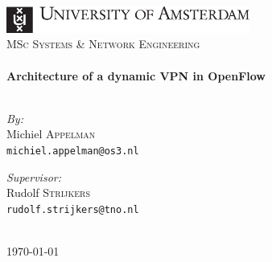 %		
%		
%		

\clearpage
\begin{titlepage}
	\begin{center}
		\hfill \\[2cm]
		\includegraphics[width=8cm]{./includes/uva.pdf}\\[0.4cm]
		{\Large \textsc{MSc Systems \&{} Network Engineering}}\\[4.5cm]
		
		\HRule \\[0.6cm]
		{ \huge \bfseries Architecture of a dynamic VPN in OpenFlow}\\[0.4cm]
		\HRule \\[4.2cm]
		\begin{minipage}
			{0.4
			\textwidth} 
			\begin{flushleft}
				\large \emph{By:}\\
				Michiel \textsc{Appelman} \\
				{\footnotesize \texttt{michiel.appelman@os3.nl}}
			\end{flushleft}
		\end{minipage}
		\begin{minipage}
			{0.4
			\textwidth} 
			\begin{flushright}
				\large \emph{Supervisor:} \\
				Rudolf \textsc{Strijkers} \\
				{\footnotesize \texttt{rudolf.strijkers@tno.nl}}
				\hfill
			\end{flushright}
		\end{minipage}
		
		\hfill \\[4cm]
		
		{\large \today}
	\end{center}
\end{titlepage}

\cleardoublepage 
